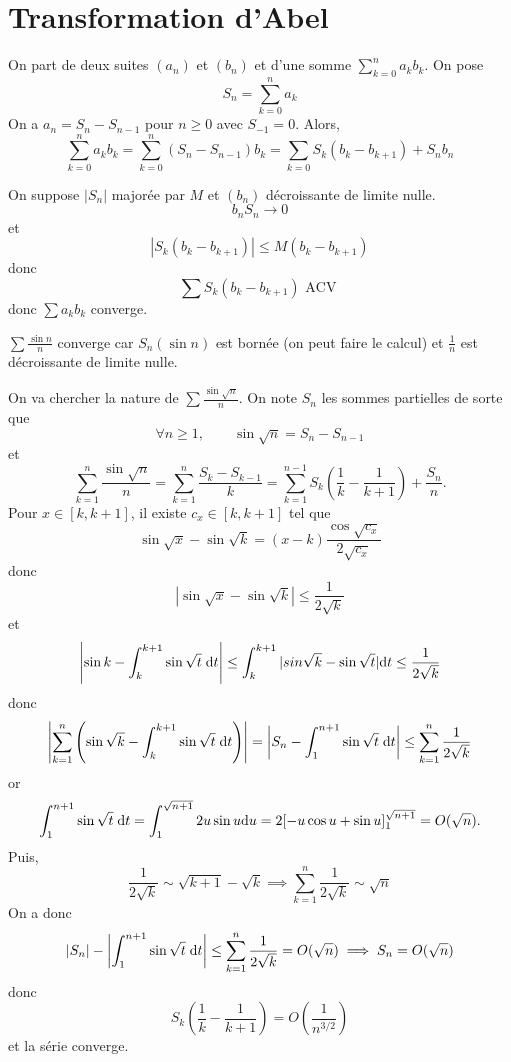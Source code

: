 \section{Transformation d'Abel}

On part de deux suites $(a_n)$ et $(b_n)$ et d'une somme $\displaystyle\sum_{k=0}^na_kb_k$. On pose \[
    S_n=\sum_{k=0}^na_k
\]
On a $a_n=S_n-S_{n-1}$ pour $n\geq 0$ avec $S_{-1}=0$. Alors, \[
    \sum_{k=0}^na_kb_k=\sum_{k=0}^n(S_n-S_{n-1})b_k=\sum_{k=0}S_k(b_k-b_{k+1})+S_n b_n
\]

\begin{ex}
    On suppose $|S_n|$ majorée par $M$ et $(b_n)$ décroissante de limite nulle. \[
        b_nS_n\longrightarrow0
    \]
    et \[
        |S_k(b_k-b_{k+1})|\leq M(b_k-b_{k+1})
    \]
    donc \[
        \sum S_k(b_k-b_{k+1})\text{ ACV }
    \]
    donc $\sum a_kb_k$ converge.
\end{ex}

\begin{ex}
    $\sum\frac{\sin n}n$ converge car $S_n(\sin n)$ est bornée (on peut faire le calcul) et $\frac1n$ est décroissante de limite nulle.
\end{ex}

\begin{ex}
    On va chercher la nature de $\sum \frac{\sin \sqrt n}n$. On note $S_n$ les sommes partielles de sorte que \[
        \forall n\geq 1, \qquad \sin \sqrt n=S_{n}-S_{n-1}
    \]
    et \[
        \sum_{k=1}^n\frac{\sin \sqrt n}{n}=\sum_{k=1}^n\frac{S_k-S_{k-1}}k=\sum_{k=1}^{n-1}S_k \left( \frac1k-\frac1{k+1} \right)+\frac{S_n}n.
    \]
    Pour $x\in [k, k+1]$, il existe $c_x\in[k, k+1]$ tel que \[
        \sin\sqrt x-\sin \sqrt k=(x-k)\frac{\cos \sqrt {c_x}}{2\sqrt {c_x}}
    \]
    donc \[
        |\sin \sqrt x-\sin \sqrt k|\leq \frac1{2\sqrt k}
    \]
    et \[
        \left| \sin k-\int_k^{k+1}\sin\sqrt t\;\mathrm{d} t \right|\leq \int_k^{k+1}|sin\sqrt k-\sin \sqrt t|\mathrm{d} t\leq \frac1{2\sqrt k}
    \]
    donc \[
        \left| \sum_{k=1}^n\left(\sin \sqrt k-\int_k^{k+1}\sin\sqrt t\;\mathrm{d} t\right) \right|= \left| S_n-\int_1^{n+1}\sin\sqrt t\;\mathrm{d} t \right| \leq \sum_{k=1}^n\frac1{2\sqrt k}
    \]
    or \[
        \int_1^{n+1}\sin\sqrt t\;\mathrm{d} t=\int_1^{\sqrt{n+1}}2u\sin u\mathrm{d} u=2[-u\cos u+\sin u]_1^{\sqrt{n+1}}=O(\sqrt n).
    \]
    Puis, \[
        \frac1{2\sqrt k}\sim\sqrt {k+1}-\sqrt k \implies \sum_{k=1}^n\frac1{2\sqrt k}\sim \sqrt n
    \]
    On a donc \[
        |S_n|- \left| \int_1^{n+1}\sin\sqrt t\;\mathrm{d} t \right|\leq \sum_{k=1}^n\frac1{2\sqrt k}=O(\sqrt n)\implies S_n=O(\sqrt n)
    \]
    donc \[
        S_k \left( \frac1k-\frac1{k+1} \right)=O\left(\frac1{n^{3/2}}\right)
    \]
    et la série converge.
\end{ex}

